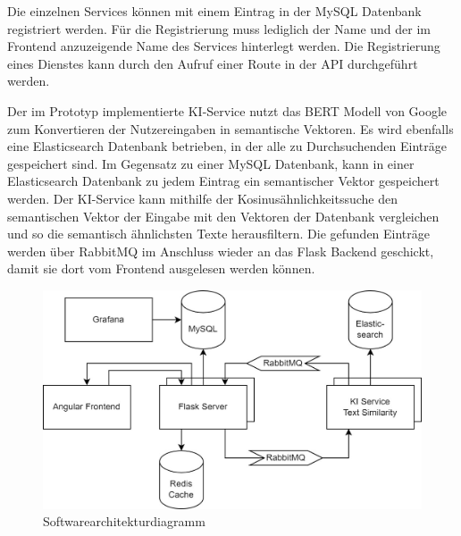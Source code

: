 Die einzelnen Services können mit einem Eintrag in der MySQL Datenbank registriert werden. Für die Registrierung muss lediglich der Name und der im Frontend anzuzeigende Name des Services hinterlegt werden. Die Registrierung eines Dienstes kann durch den Aufruf einer Route in der API durchgeführt werden. 

Der im Prototyp implementierte KI-Service nutzt das BERT Modell von Google zum Konvertieren der Nutzereingaben in semantische Vektoren. Es wird ebenfalls eine Elasticsearch Datenbank betrieben, in der alle zu Durchsuchenden Einträge gespeichert sind. Im Gegensatz zu einer MySQL Datenbank, kann in einer Elasticsearch Datenbank zu jedem Eintrag ein semantischer Vektor gespeichert werden. Der KI-Service kann mithilfe der Kosinusähnlichkeitssuche den semantischen Vektor der Eingabe mit den Vektoren der Datenbank vergleichen und so die semantisch ähnlichsten Texte herausfiltern. Die gefunden Einträge werden über RabbitMQ im Anschluss wieder an das Flask Backend geschickt, damit sie dort vom Frontend ausgelesen werden können.

\begin{figure}[H]
  \centering
    \includegraphics[width = 15cm]{bilder/Architektur}
    \caption{Softwarearchitekturdiagramm}
\end{figure}

